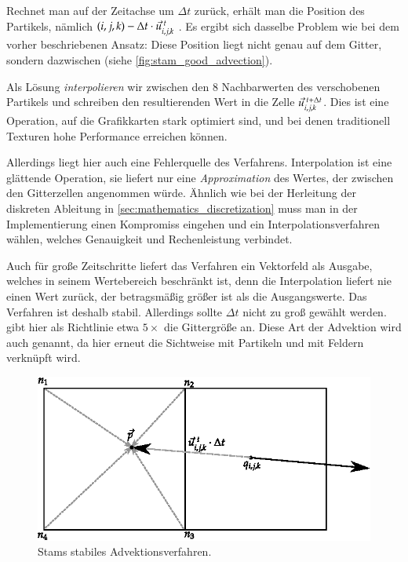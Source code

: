 Rechnet man auf der Zeitachse um $\Delta t$ zurück, erhält man die
 Position des Partikels, nämlich $(i,j,k) -
\Delta t \cdot \vec{u}_{i,j,k}^{\textnormal{ }t}$ . Es ergibt sich dasselbe Problem wie bei
dem vorher beschriebenen Ansatz: Diese Position liegt nicht genau auf
dem Gitter, sondern dazwischen (siehe
\autoref{fig:stam_good_advection}).

Als Lösung \emph{interpolieren} wir zwischen den 8 Nachbarwerten des
verschobenen Partikels und schreiben den resultierenden Wert in die Zelle
$\vec{u}_{i,j,k}^{\textnormal{ }t+\Delta t}$. Dies ist eine Operation, auf die Grafikkarten stark
optimiert sind, und bei denen traditionell Texturen hohe Performance erreichen
können.

Allerdings liegt hier auch eine Fehlerquelle des Verfahrens. Interpolation ist
eine glättende Operation, sie liefert nur eine \emph{Approximation} des Wertes,
der zwischen den Gitterzellen angenommen würde. Ähnlich wie bei der
Herleitung der diskreten Ableitung in \autoref{sec:mathematics_discretization}
muss man in der Implementierung einen Kompromiss eingehen und ein
Interpolationsverfahren wählen, welches Genauigkeit und Rechenleistung verbindet.

Auch für große Zeitschritte liefert das Verfahren ein Vektorfeld als Ausgabe,
welches in seinem Wertebereich beschränkt ist, denn die Interpolation liefert nie einen
Wert zurück, der betragsmäßig größer ist als die Ausgangswerte. Das Verfahren
ist deshalb stabil. Allerdings sollte $\Delta t$ nicht zu groß gewählt werden.
\cite{Foster} gibt hier als Richtlinie etwa $5\times$ die Gittergröße
an. Diese Art der Advektion wird auch
 genannt, da hier erneut
die Sichtweise mit Partikeln und mit Feldern verknüpft wird.

\begin{figure}[ht]
\centering
\includegraphics[width=12cm]{images/advection_good}
\caption{Stams stabiles Advektionsverfahren.}
\label{fig:stam_good_advection}
\end{figure}

